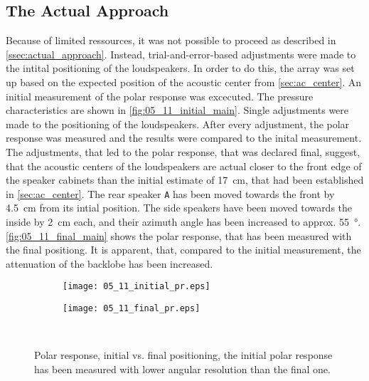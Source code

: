 \subsection{The Actual Approach}\label{ssec:actual_approach}
Because of limited ressources, it was not possible to proceed as described in \autoref{ssec:actual_approach}. Instead, trial-and-error-based adjustments were made to the intital positioning of the loudspeakers. In order to do this, the array was set up based on the  expected position of the acoustic center from \autoref{sec:ac_center}. An initial measurement of the polar response was excecuted. The pressure characteristics are shown in \autoref{fig:05_11_initial_main}. Single adjustments were made to the positioning of the loudspeakers. After every adjustment, the polar response was measured and the results were compared to the inital measurement. The adjustments, that led to the polar response, that was declared final, suggest, that the acoustic centers of the loudspeakers are actual closer to the front edge of the speaker cabinets than the initial estimate of \SI{17}{\centi\meter}, that had been established in \autoref{sec:ac_center}. The rear speaker \texttt{A} has been moved towards the front by \SI{4.5}{\centi\meter} from its intial position. The side speakers have been moved towards the inside by \SI{2}{\centi\meter} each, and their azimuth angle has been increased to approx. \SI{55}{\degree}. \autoref{fig:05_11_final_main} shows the polar response, that has been measured with the final positiong. It is apparent, that, compared to the initial measurement, the attenuation of the backlobe has been increased.

\begin{figure}[H]
\begin{subfigure}[c]{0.5\textwidth}
\texttt{[image: 05\_11\_initial\_pr.eps]}
\label{fig:05_11_initial_main}
\end{subfigure}
\begin{subfigure}[c]{0.5\textwidth}
\texttt{[image: 05\_11\_final\_pr.eps]}
\label{fig:05_11_final_main}
\end{subfigure}\\
\caption{Polar response, initial vs. final positioning, the initial polar response has been measured with lower angular resolution than the final one.}  
\label{fig:05_11_adjustments}
\end{figure}